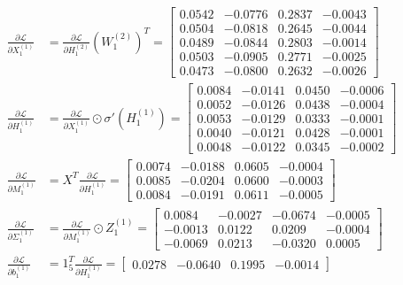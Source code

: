 \documentclass[11pt,a4paper]{article}
\def\mathbf#1{#1}%
\theoremstyle{plain}
\theoremstyle{definition}
\theoremstyle{remark}
\begin{document}
\begin{enumerate}
\begin{itemize}
        \begin{align}
            \frac{\partial \mathcal{L}}{\partial X^{(1)}_1} &= \frac{\partial \mathcal{L}}{\partial H^{(2)}_1} \left(W^{(2)}_1\right)^T = \begin{bmatrix}
                0.0542 & -0.0776 & 0.2837 & -0.0043 \\
                0.0504 & -0.0818 & 0.2645 & -0.0044 \\
                0.0489 & -0.0844 & 0.2803 & -0.0014 \\
                0.0503 & -0.0905 & 0.2771 & -0.0025 \\
                0.0473 & -0.0800 & 0.2632 & -0.0026
            \end{bmatrix} \\[0.2em]
            \frac{\partial \mathcal{L}}{\partial H^{(1)}_1} &= \frac{\partial \mathcal{L}}{\partial X^{(1)}_1} \odot \sigma'\!\left(H^{(1)}_1\right) = \begin{bmatrix}
                0.0084 & -0.0141 & 0.0450 & -0.0006 \\
                0.0052 & -0.0126 & 0.0438 & -0.0004 \\
                0.0053 & -0.0129 & 0.0333 & -0.0001 \\
                0.0040 & -0.0121 & 0.0428 & -0.0001 \\
                0.0048 & -0.0122 & 0.0345 & -0.0002
            \end{bmatrix} \\[0.2em]
            \frac{\partial \mathcal{L}}{\partial M^{(1)}_1} &= X^T \frac{\partial \mathcal{L}}{\partial H^{(1)}_1} = \begin{bmatrix}
                0.0074 & -0.0188 & 0.0605 & -0.0004 \\
                0.0085 & -0.0204 & 0.0600 & -0.0003 \\
                0.0084 & -0.0191 & 0.0611 & -0.0005
            \end{bmatrix} \\[0.2em]
            \frac{\partial \mathcal{L}}{\partial \Sigma^{(1)}_1} &= \frac{\partial \mathcal{L}}{\partial M^{(1)}_1} \odot Z^{(1)}_1 = \begin{bmatrix}
                 0.0084 & -0.0027 & -0.0674 & -0.0005 \\
                -0.0013 &  0.0122 &  0.0209 & -0.0004 \\
                -0.0069 &  0.0213 & -0.0320 &  0.0005
            \end{bmatrix} \\[0.2em]
            \frac{\partial \mathcal{L}}{\partial \mathbf{b}^{(1)}_1} &= \mathbf{1}_5^T \frac{\partial \mathcal{L}}{\partial H^{(1)}_1} = \begin{bmatrix} 0.0278 & -0.0640 & 0.1995 & -0.0014 \end{bmatrix}
        \end{align}
    \end{itemize}


\end{enumerate}
\end{document}
